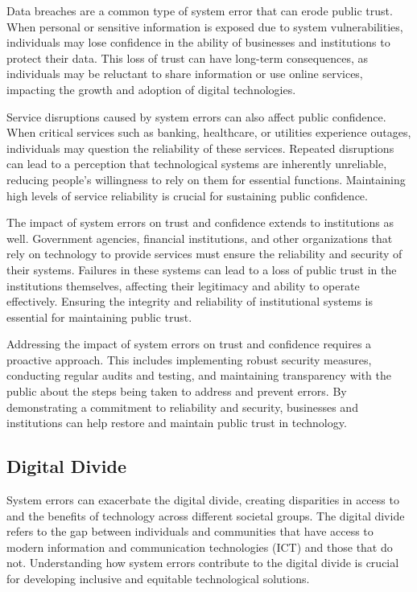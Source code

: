 \documentclass[10pt, conference, letterpaper]{IEEEtran}
\begin{document}
Data breaches are a common type of system error that can erode public trust. When personal or sensitive information is exposed due to system vulnerabilities, individuals may lose confidence in the ability of businesses and institutions to protect their data. This loss of trust can have long-term consequences, as individuals may be reluctant to share information or use online services, impacting the growth and adoption of digital technologies.

Service disruptions caused by system errors can also affect public confidence. When critical services such as banking, healthcare, or utilities experience outages, individuals may question the reliability of these services. Repeated disruptions can lead to a perception that technological systems are inherently unreliable, reducing people's willingness to rely on them for essential functions. Maintaining high levels of service reliability is crucial for sustaining public confidence.

The impact of system errors on trust and confidence extends to institutions as well. Government agencies, financial institutions, and other organizations that rely on technology to provide services must ensure the reliability and security of their systems. Failures in these systems can lead to a loss of public trust in the institutions themselves, affecting their legitimacy and ability to operate effectively. Ensuring the integrity and reliability of institutional systems is essential for maintaining public trust.

Addressing the impact of system errors on trust and confidence requires a proactive approach. This includes implementing robust security measures, conducting regular audits and testing, and maintaining transparency with the public about the steps being taken to address and prevent errors. By demonstrating a commitment to reliability and security, businesses and institutions can help restore and maintain public trust in technology.

\subsection{Digital Divide}
System errors can exacerbate the digital divide, creating disparities in access to and the benefits of technology across different societal groups. The digital divide refers to the gap between individuals and communities that have access to modern information and communication technologies (ICT) and those that do not. Understanding how system errors contribute to the digital divide is crucial for developing inclusive and equitable technological solutions.
\end{document}
